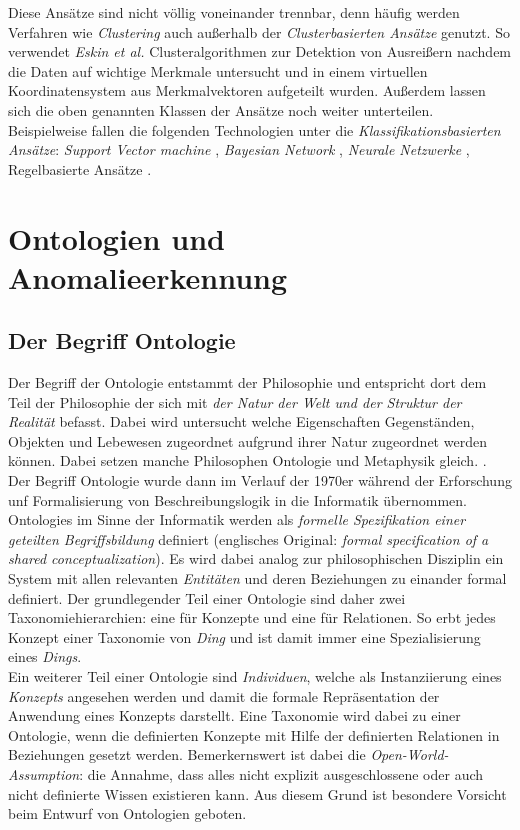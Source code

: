 Diese Ansätze sind nicht völlig voneinander trennbar, denn häufig werden Verfahren wie \textit{Clustering} auch außerhalb der \textit{Clusterbasierten Ansätze} genutzt. So verwendet \textit{Eskin et al.} \cite{eskin2002geometric} Clusteralgorithmen zur Detektion von Ausreißern nachdem die Daten auf wichtige Merkmale untersucht und in einem virtuellen Koordinatensystem aus Merkmalvektoren aufgeteilt wurden. Außerdem lassen sich die oben genannten Klassen der Ansätze noch weiter unterteilen. Beispielweise fallen die folgenden Technologien unter die \textit{Klassifikationsbasierten Ansätze}: \textit{Support Vector machine} \cite{noble2006support}, \textit{Bayesian Network} \cite{kruegel2003bayesian}, \textit{Neurale Netzwerke} \cite{zhang2001hide}, Regelbasierte Ansätze \cite{yang2013rule}.

\section{Ontologien und Anomalieerkennung}
\subsection{Der Begriff Ontologie}
Der Begriff der \Gls{Ontologie} entstammt der Philosophie und entspricht dort dem Teil der Philosophie der sich mit \textit{der Natur der Welt und der Struktur der Realität} befasst. Dabei wird untersucht welche Eigenschaften  Gegenständen, Objekten und Lebewesen zugeordnet aufgrund ihrer Natur zugeordnet werden können. Dabei setzen manche Philosophen \Gls{Ontologie} und Metaphysik gleich. \cite{guarino2009ontology}.\\
Der Begriff \Gls{Ontologie} wurde dann im Verlauf der 1970er während der Erforschung unf Formalisierung von Beschreibungslogik in die Informatik übernommen\cite{roy2010exploitation}. \Glspl{Ontologie} im Sinne der Informatik werden als \textit{formelle Spezifikation einer geteilten Begriffsbildung} definiert (englisches Original: \textit{formal speciﬁcation of a shared conceptualization}\cite{borst1999construction}). Es wird dabei analog zur philosophischen Disziplin ein System mit allen relevanten \textit{Entitäten} und deren Beziehungen zu einander formal definiert. Der grundlegender Teil einer Ontologie sind daher zwei Taxonomiehierarchien: eine für Konzepte und eine für Relationen. So erbt jedes Konzept einer Taxonomie von \textit{Ding} und ist damit immer eine Spezialisierung eines \textit{Dings}.\\
Ein weiterer Teil einer Ontologie sind \textit{Individuen}, welche als Instanziierung eines \textit{Konzepts} angesehen werden und damit die formale Repräsentation der Anwendung eines Konzepts darstellt. Eine Taxonomie wird dabei zu einer Ontologie, wenn die definierten Konzepte mit Hilfe der definierten Relationen in Beziehungen gesetzt werden. Bemerkernswert ist dabei die \textit{Open-World-Assumption}: die Annahme, dass alles nicht explizit ausgeschlossene oder auch nicht definierte Wissen existieren kann\cite{razniewski2016turning}. Aus diesem Grund ist besondere Vorsicht beim Entwurf von Ontologien geboten.

